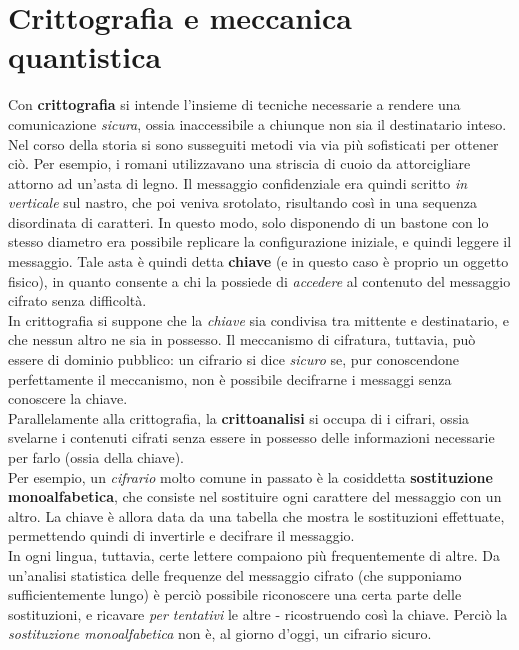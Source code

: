 \documentclass[../../InformazioneQuantistica.tex]{subfiles}
\begin{document}
\section{Crittografia e meccanica quantistica}
Con \textbf{crittografia} si intende l'insieme di tecniche necessarie a rendere una comunicazione \textit{sicura}, ossia inaccessibile a chiunque non sia il destinatario inteso.\\ 
Nel corso della storia si sono susseguiti metodi via via più sofisticati per ottener ciò. Per esempio, i romani utilizzavano una striscia di cuoio da attorcigliare attorno ad un'asta di legno. Il messaggio confidenziale era quindi scritto \textit{in verticale} sul nastro, che poi veniva srotolato, risultando così in una sequenza disordinata di caratteri. In questo modo, solo disponendo di un bastone con lo stesso diametro era possibile replicare la configurazione iniziale, e quindi leggere il messaggio. Tale asta è quindi detta \textbf{chiave} (e in questo caso è proprio un oggetto fisico), in quanto consente a chi la possiede di \textit{accedere} al contenuto del messaggio cifrato senza difficoltà.\\
In crittografia si suppone che la \textit{chiave} sia condivisa tra mittente e destinatario, e che nessun altro ne sia in possesso. Il meccanismo di cifratura, tuttavia, può essere di dominio pubblico: un cifrario si dice \textit{sicuro} se, pur conoscendone perfettamente il meccanismo, non è possibile decifrarne i messaggi senza conoscere la chiave.\\

Parallelamente alla crittografia, la \textbf{crittoanalisi} si occupa di  i cifrari, ossia svelarne i contenuti cifrati senza essere in possesso delle informazioni necessarie per farlo (ossia della chiave).\\

Per esempio, un \textit{cifrario} molto comune in passato è la cosiddetta \textbf{sostituzione monoalfabetica}, che consiste nel sostituire ogni carattere del messaggio con un altro. La chiave è allora data da una tabella che mostra le sostituzioni effettuate, permettendo quindi di invertirle e decifrare il messaggio.\\
In ogni lingua, tuttavia, certe lettere compaiono più frequentemente di altre. Da un'analisi statistica delle frequenze del messaggio cifrato (che supponiamo sufficientemente lungo) è perciò possibile riconoscere una certa parte delle sostituzioni, e ricavare \textit{per tentativi} le altre - ricostruendo così la chiave. Perciò la \textit{sostituzione monoalfabetica} non è, al giorno d'oggi, un cifrario sicuro.
\end{document}
